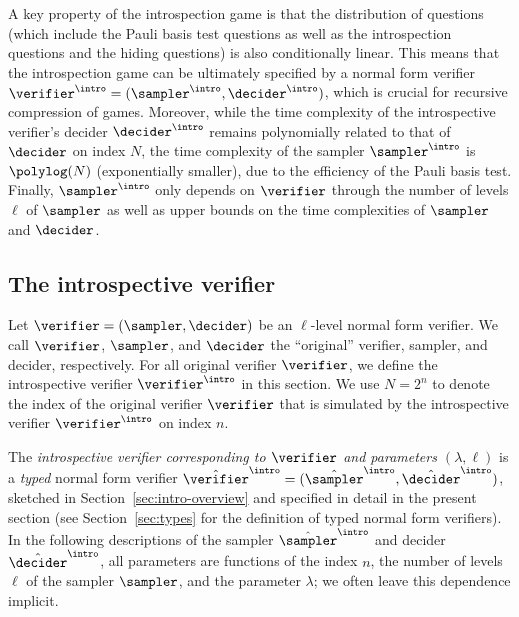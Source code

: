 A key property of the introspection game is that the distribution of questions
(which include the Pauli basis test questions as well as the introspection
questions and the hiding questions) is also conditionally linear.
This means that the introspection game can be ultimately specified by a normal
form verifier $\verifier^\intro = (\sampler^\intro,\decider^\intro)$, which is
crucial for recursive compression of games.
Moreover, while the time complexity of the introspective verifier's decider
$\decider^\intro$ remains polynomially related to that of $\decider$ on index
$N$, the time complexity of the sampler $\sampler^\intro$ is $\polylog(N)$
(exponentially smaller), due to the efficiency of the Pauli basis test.
Finally, $\sampler^\intro$ only depends on $\verifier$ through the number of
levels $\ell$ of $\sampler$ as well as upper bounds on the time complexities of
$\sampler$ and $\decider$.

\subsection{The introspective verifier}
\label{sec:intro-verifier}

\def\tsint{\hat{\sampler}^\intro}
\def\tdint{\hat{\decider}^\intro}
\def\tvint{\hat{\verifier}^\intro}
\def\sint{\sampler^\intro}
\def\dint{\decider^\intro}
\def\vint{\verifier^\intro}

Let $\verifier = (\sampler, \decider)$ be an $\ell$-level normal form verifier.
We call $\verifier$, $\sampler$, and $\decider$ the ``original'' verifier,
sampler, and decider, respectively.
For all original verifier $\verifier$, we define the introspective verifier
$\vint$ in this section.
We use $N = 2^n$ to denote the index of the original verifier $\verifier$ that
is simulated by the introspective verifier $\vint$ on index $n$.





The \emph{introspective verifier corresponding to $\verifier$ and parameters
  $(\lambda,\ell)$} is a \emph{typed} normal form verifier $\tvint
=(\tsint, \tdint)$, sketched in
Section~\ref{sec:intro-overview} and specified in detail in the present section
(see Section~\ref{sec:types} for the definition of typed normal form verifiers).
In the following descriptions of the sampler $\tsint$ and decider
$\tdint$, all parameters are functions of the index $n$, the number of
levels $\ell$ of the sampler $\sampler$, and the parameter $\lambda$; we often
leave this dependence implicit.

